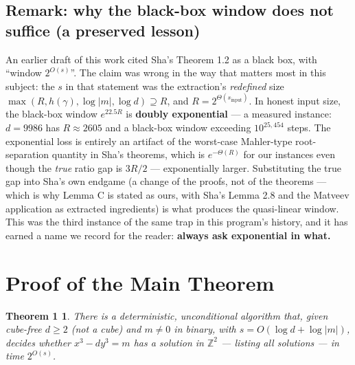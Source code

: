 \documentclass[11pt]{amsart}
\theoremstyle{plain}
\newtheorem*{theoremmain}{Theorem 1}
\theoremstyle{remark}
\begin{document}
\subsection{Remark: why the black-box window does not suffice (a
  preserved lesson)}\label{rem:blackbox}

An earlier draft of this work cited Sha's Theorem 1.2 \cite{Sha19} as
a black box, with ``window $2^{O(s)}$''. The claim was wrong in the
way that matters most in this subject: the $s$ in that statement was
the extraction's \emph{redefined} size
$\max(R, h(\gamma), \log|m|, \log d) \supseteq R$, and
$R = 2^{\Theta(s_{\mathrm{input}})}$. In honest input size, the
black-box window $e^{22.5R}$ is \textbf{doubly exponential} --- a
measured instance: $d = 9986$ has $R \approx 2605$ and a black-box
window exceeding $10^{25{,}454}$ steps. The exponential loss is
entirely an artifact of the worst-case Mahler-type root-separation
quantity in Sha's theorems, which is $e^{-\Theta(R)}$ for our
instances even though the \emph{true} ratio gap is $3R/2$ ---
exponentially larger. Substituting the true gap into Sha's own
endgame (a change of the proofs, not of the theorems --- which is why
Lemma C is stated as ours, with Sha's Lemma 2.8 and the Matveev
application as extracted ingredients) is what produces the
quasi-linear window. This was the third instance of the same trap in
this program's history, and it has earned a name we record for the
reader: \textbf{always ask exponential in what.}

\section{Proof of the Main Theorem}\label{sec:proofmain}

\begin{theoremmain}
There is a deterministic, unconditional algorithm that, given
cube-free $d \ge 2$ (not a cube) and $m \ne 0$ in binary, with
$s = O(\log d + \log|m|)$, decides whether $x^3 - dy^3 = m$ has a
solution in $\mathbb{Z}^2$ --- listing all solutions --- in time
$2^{O(s)}$.
\end{theoremmain}
\end{document}
